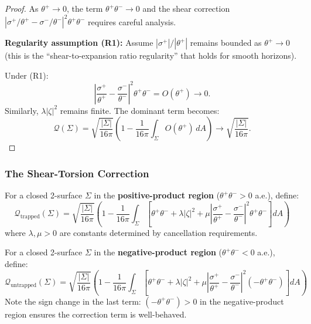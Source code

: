 \begin{proof}
As $\theta^+ \to 0$, the term $\theta^+\theta^- \to 0$ and the shear correction $|\sigma^+/\theta^+ - \sigma^-/\theta^-|^2\theta^+\theta^-$ requires careful analysis.

\textbf{Regularity assumption (R1):} Assume $|\sigma^+|/|\theta^+|$ remains bounded as $\theta^+ \to 0$ (this is the ``shear-to-expansion ratio regularity'' that holds for smooth horizons).

Under (R1):
\begin{equation}
\left|\frac{\sigma^+}{\theta^+} - \frac{\sigma^-}{\theta^-}\right|^2\theta^+\theta^- = O(\theta^+) \to 0.
\end{equation}
Similarly, $\lambda|\zeta|^2$ remains finite. The dominant term becomes:
\begin{equation}
\mathcal{Q}(\Sigma) = \sqrt{\frac{|\Sigma|}{16\pi}}\left(1 - \frac{1}{16\pi}\int_\Sigma O(\theta^+) \, dA\right) \to \sqrt{\frac{|\Sigma|}{16\pi}}.
\end{equation}
\end{proof}

\subsubsection{The Shear-Torsion Correction}

\begin{definition}
\label{def:corrected-mass-v1}
For a closed 2-surface $\Sigma$ in the \textbf{positive-product region} ($\theta^+\theta^- > 0$ a.e.), define:
\begin{equation}
\boxed{\mathcal{Q}_{\text{trapped}}(\Sigma) = \sqrt{\frac{|\Sigma|}{16\pi}}\left(1 - \frac{1}{16\pi}\int_\Sigma \left[\theta^+\theta^- + \lambda|\zeta|^2 + \mu\left|\frac{\sigma^+}{\theta^+} - \frac{\sigma^-}{\theta^-}\right|^2\theta^+\theta^-\right] dA\right)}
\label{eq:corrected-mass-trapped}
\end{equation}
where $\lambda, \mu > 0$ are constants determined by cancellation requirements.
\end{definition}

\begin{definition}
\label{def:corrected-mass-untrapped}
For a closed 2-surface $\Sigma$ in the \textbf{negative-product region} ($\theta^+\theta^- < 0$ a.e.), define:
\begin{equation}
\boxed{\mathcal{Q}_{\text{untrapped}}(\Sigma) = \sqrt{\frac{|\Sigma|}{16\pi}}\left(1 - \frac{1}{16\pi}\int_\Sigma \left[\theta^+\theta^- + \lambda|\zeta|^2 + \mu\left|\frac{\sigma^+}{\theta^+} - \frac{\sigma^-}{\theta^-}\right|^2(-\theta^+\theta^-)\right] dA\right)}
\label{eq:corrected-mass-untrapped}
\end{equation}
Note the sign change in the last term: $(-\theta^+\theta^-) > 0$ in the negative-product region ensures the correction term is well-behaved.
\end{definition}

